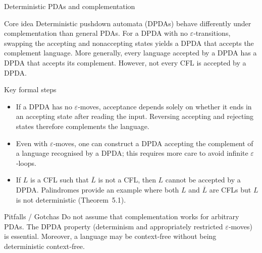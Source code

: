 \begin{frame}[t]{Deterministic PDAs and complementation}
  \begin{tblock}{Core idea}
    Deterministic pushdown automata (DPDAs) behave differently under
    complementation than general PDAs.  For a DPDA with no
    $\varepsilon$‑transitions, swapping the accepting and nonaccepting
    states yields a DPDA that accepts the complement language.  More
    generally, every language accepted by a DPDA has a DPDA that
    accepts its complement.  However, not every CFL is accepted by a
    DPDA.
  \end{tblock}
  \begin{tblock}{Key formal steps}
    \begin{itemize}
      \item If a DPDA has no $\varepsilon$‑moves, acceptance depends
        solely on whether it ends in an accepting state after reading
        the input.  Reversing accepting and rejecting states therefore
        complements the language.
      \item Even with $\varepsilon$‑moves, one can construct a DPDA
        accepting the complement of a language recognised by a DPDA;
        this requires more care to avoid infinite $\varepsilon$‑loops.
      \item If $L$ is a CFL such that $\overline{L}$ is not a CFL,
        then $L$ cannot be accepted by a DPDA.  Palindromes provide an
        example where both $L$ and $\overline{L}$ are CFLs but $L$ is
        not deterministic (Theorem 5.1).
    \end{itemize}
  \end{tblock}
  \begin{talert}{Pitfalls / Gotchas}
    Do not assume that complementation works for arbitrary PDAs.  The
    DPDA property (determinism and appropriately restricted
    $\varepsilon$‑moves) is essential.  Moreover, a language may be
    context‑free without being deterministic context‑free.
  \end{talert}
  \label{fr:6.2-18}
\end{frame}

